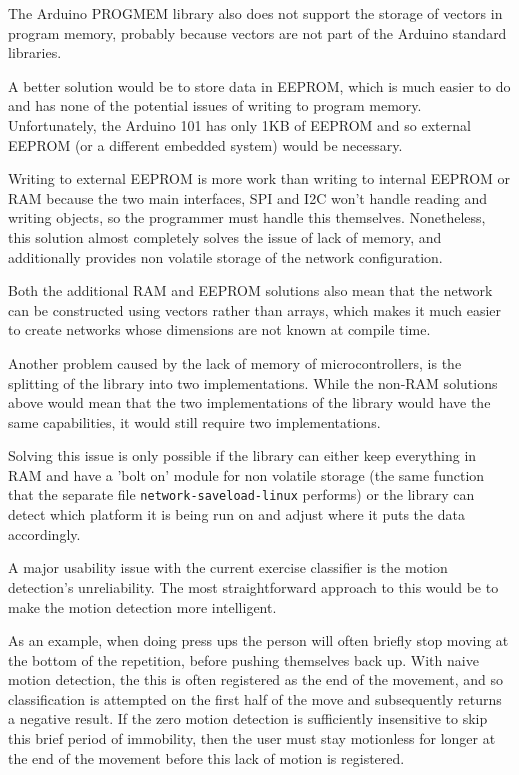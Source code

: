 \documentclass[a4paper]{article}
\begin{document}
The Arduino PROGMEM library also does not support the storage of vectors in program memory, probably because vectors are not part of the Arduino standard libraries.

A better solution would be to store data in EEPROM, which is much easier to do and has none of the potential issues of writing to program memory.\cite{fwref1} Unfortunately, the Arduino 101 has only 1KB of EEPROM and so external EEPROM (or a different embedded system) would be necessary.

Writing to external EEPROM is more work than writing to internal EEPROM or RAM because the two main interfaces, SPI and I2C won't handle reading and writing objects, so the programmer must handle this themselves. Nonetheless, this solution almost completely solves the issue of lack of memory, and additionally provides non volatile storage of the network configuration.

Both the additional RAM and EEPROM solutions also mean that the network can be constructed using vectors rather than arrays, which makes it much easier to create networks whose dimensions are not known at compile time. 

Another problem caused by the lack of memory of microcontrollers, is the splitting of the library into two implementations. While the non-RAM solutions above would mean that the two implementations of the library would have the same capabilities, it would still require two implementations.

Solving this issue is only possible if the library can either keep everything in RAM and have a 'bolt on' module for non volatile storage (the same function that the separate file \lstinline{network-saveload-linux} performs) or the library can detect which platform it is being run on and adjust where it puts the data accordingly. 

A major usability issue with the current exercise classifier is the motion detection's unreliability. The most straightforward approach to this would be to make the motion detection more intelligent. 

As an example, when doing press ups the person will often briefly stop moving at the bottom of the repetition, before pushing themselves back up. With naive motion detection, the this is often registered as the end of the movement, and so classification is attempted on the first half of the move and subsequently returns a negative result.
If the zero motion detection is sufficiently insensitive to skip this brief period of immobility, then the user must stay motionless for longer at the end of the movement before this lack of motion is registered.
\end{document}
